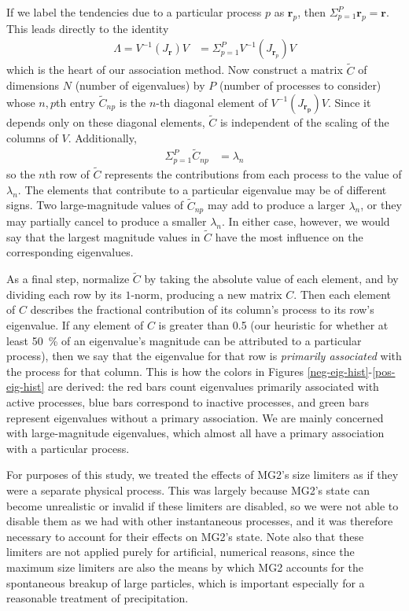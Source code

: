 \documentclass [11pt, proquest] {uwthesis}[2020/02/24]
\begin{document}
If we label the tendencies due to a particular process $p$ as $\mathbf{r}_p$, then $\Sigma_{p=1}^{P}\mathbf{r}_p = \mathbf{r}$. This leads directly to the identity
\begin{eqnarray}
  \Lambda = V^{-1} (J_{\mathbf{r}}) V &= \Sigma_{p=1}^{P}V^{-1} (J_{\mathbf{r}_p}) V
\end{eqnarray}
which is the heart of our association method. Now construct a matrix $\tilde{C}$ of dimensions $N$ (number of eigenvalues) by $P$ (number of processes to consider) whose $n,p$th entry $\tilde{C}_{np}$ is the $n$-th diagonal element of $V^{-1} (J_{\mathbf{r_p}})V$. Since it depends only on these diagonal elements, $\tilde{C}$ is independent of the scaling of the columns of $V$. Additionally,
\begin{eqnarray}
  \Sigma_{p=1}^{P}\tilde{C}_{np} &= \lambda_{n}
\end{eqnarray}
so the $n$th row of $\tilde{C}$ represents the contributions from each process to the value of $\lambda_{n}$. The elements that contribute to a particular eigenvalue may be of different signs. Two large-magnitude values of $\tilde{C}_{np}$ may add to produce a larger $\lambda_{n}$, or they may partially cancel to produce a smaller $\lambda_{n}$. In either case, however, we would say that the largest magnitude values in $\tilde{C}$ have the most influence on the corresponding eigenvalues.

As a final step, normalize $\tilde{C}$ by taking the absolute value of each element, and by dividing each row by its $1$-norm, producing a new matrix $C$. Then each element of $C$ describes the fractional contribution of its column's process to its row's eigenvalue. If any element of $C$ is greater than \num{0.5} (our heuristic for whether at least \SI{50}{\percent} of an eigenvalue's magnitude can be attributed to a particular process), then we say that the eigenvalue for that row is \emph{primarily associated} with the process for that column. This is how the colors in Figures \ref{neg-eig-hist}-\ref{pos-eig-hist} are derived: the red bars count eigenvalues primarily associated with active processes, blue bars correspond to inactive processes, and green bars represent eigenvalues without a primary association. We are mainly concerned with large-magnitude eigenvalues, which almost all have a primary association with a particular process.

For purposes of this study, we treated the effects of MG2's size limiters as if they were a separate physical process. This was largely because MG2's state can become unrealistic or invalid if these limiters are disabled, so we were not able to disable them as we had with other instantaneous processes, and it was therefore necessary to account for their effects on MG2's state. Note also that these limiters are not applied purely for artificial, numerical reasons, since the maximum size limiters are also the means by which MG2 accounts for the spontaneous breakup of large particles, which is important especially for a reasonable treatment of precipitation.
\end{document}

